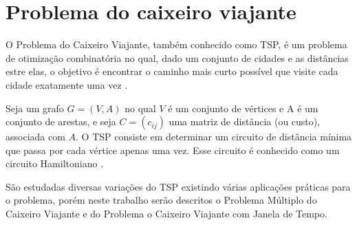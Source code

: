 


\section{Problema do caixeiro viajante}

O Problema do Caixeiro Viajante, também conhecido como \ac{TSP}, é um problema de otimização combinatória no qual, dado um conjunto de cidades e as distâncias estre elas, o objetivo é encontrar o caminho mais curto possível que visite cada cidade exatamente uma vez \cite{goyal:2010}.

Seja um grafo $G = (V,A)$ no qual $V$ é um conjunto de vértices e A é um conjunto de arestas, e seja $C = (c_{ij})$ uma matriz de distância (ou custo), associada com $A$. O \ac{TSP} consiste em determinar um circuito de distância mínima que passa por cada vértice apenas uma vez. Esse circuito é conhecido como um circuito Hamiltoniano \cite{laporte:1992}.

São estudadas diversas variações do \ac{TSP} existindo várias aplicações práticas para o problema, porém neste trabalho serão descritos o Problema Múltiplo do Caixeiro Viajante e do Problema o Caixeiro Viajante com Janela de Tempo. 

